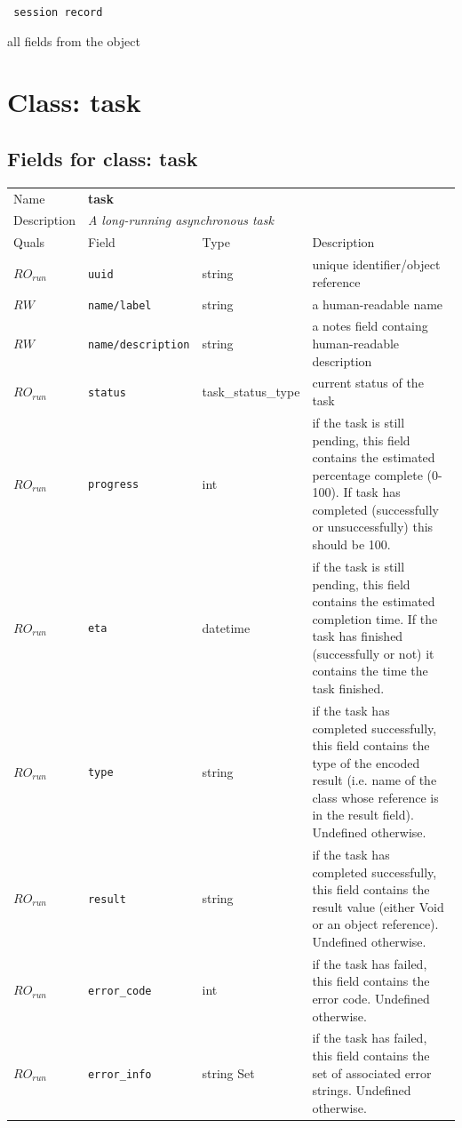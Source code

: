\vspace{0.3cm}

{\tt 
session record
}


all fields from the object
\vspace{0.3cm}
\vspace{0.3cm}
\vspace{0.3cm}

\vspace{1cm}
\newpage
\section{Class: task}
\subsection{Fields for class: task}
\begin{longtable}{|lllp{}|}
\hline
\multicolumn{1}{|l}{Name} & \multicolumn{3}{l|}{\bf task} \\
\multicolumn{1}{|l}{Description} & \multicolumn{3}{l|}{\parbox{11cm}{\em A long-running asynchronous task}} \\
\hline
Quals & Field & Type & Description \\
\hline
$\mathit{RO}_\mathit{run}$ &  {\tt uuid} & string & unique identifier/object reference \\
$\mathit{RW}$ &  {\tt name/label} & string & a human-readable name \\
$\mathit{RW}$ &  {\tt name/description} & string & a notes field containg human-readable description \\
$\mathit{RO}_\mathit{run}$ &  {\tt status} & task\_status\_type & current status of the task \\
$\mathit{RO}_\mathit{run}$ &  {\tt progress} & int & if the task is still pending, this field contains the estimated percentage complete (0-100). If task has completed (successfully or unsuccessfully) this should be 100. \\
$\mathit{RO}_\mathit{run}$ &  {\tt eta} & datetime & if the task is still pending, this field contains the estimated completion time. If the task has finished (successfully or not) it contains the time the task finished. \\
$\mathit{RO}_\mathit{run}$ &  {\tt type} & string & if the task has completed successfully, this field contains the type of the encoded result (i.e. name of the class whose reference is in the result field). Undefined otherwise. \\
$\mathit{RO}_\mathit{run}$ &  {\tt result} & string & if the task has completed successfully, this field contains the result value (either Void or an object reference). Undefined otherwise. \\
$\mathit{RO}_\mathit{run}$ &  {\tt error\_code} & int & if the task has failed, this field contains the error code. Undefined otherwise. \\
$\mathit{RO}_\mathit{run}$ &  {\tt error\_info} & string Set & if the task has failed, this field contains the set of associated error strings. Undefined otherwise. \\
\hline
\end{longtable}
